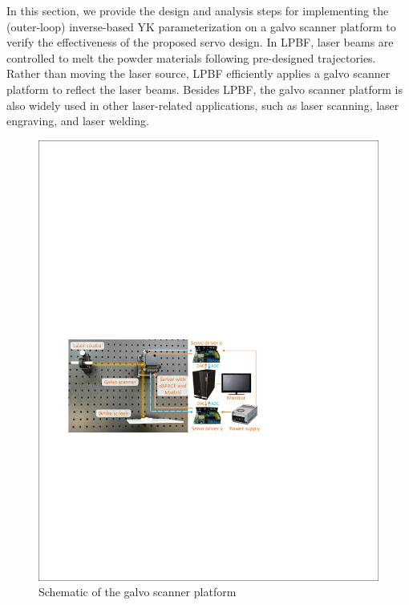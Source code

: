 \documentclass [11pt, proquest] {uwthesis}[2020/02/24]
\begin{document}
\label{sec:A-case-study} In this section, we provide the design and
analysis steps for implementing the (outer-loop) inverse-based YK
parameterization on a galvo scanner platform to verify the effectiveness
of the proposed servo design. In LPBF, laser beams are controlled to melt the powder materials
following pre-designed trajectories. Rather than moving the laser
source, LPBF efficiently applies a galvo scanner platform to reflect
the laser beams. Besides LPBF, the galvo scanner platform is also widely
used in other laser-related applications, such as laser scanning, laser
engraving, and laser welding.
\begin{figure}[!ht]
\begin{centering}
\includegraphics[width=13cm]{Fractional-order-RC/system setup}
\par\end{centering}
\caption{\label{fig:Schematic-of-hardware-LS}Schematic of the galvo scanner platform}
\end{figure}
\end{document}
